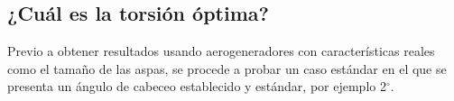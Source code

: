 

\subsection{¿Cuál es la torsión óptima?}

Previo a obtener resultados usando aerogeneradores con características reales como el tamaño de las aspas, se procede a probar un caso estándar en el que se presenta un ángulo de cabeceo establecido y estándar, por ejemplo 2$^{\circ}$.

